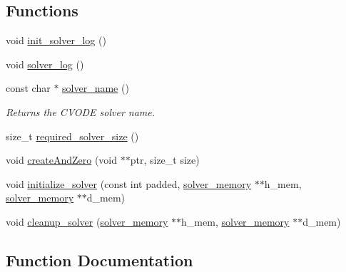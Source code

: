 \subsection*{Functions}
\begin{DoxyCompactItemize}
\item 
void \hyperlink{radau2a__init_8cu_a39c825543042903f579cd9c35a279dca}{init\+\_\+solver\+\_\+log} ()
\item 
void \hyperlink{radau2a__init_8cu_ae95cbe81062a829668c5fa8e28b2e2c7}{solver\+\_\+log} ()
\item 
const char $\ast$ \hyperlink{radau2a__init_8cu_a4ca568c33c1f8f478970cc5eec5d1d81}{solver\+\_\+name} ()
\begin{DoxyCompactList}\small\item\em Returns the C\+V\+O\+DE solver name. \end{DoxyCompactList}\item 
size\+\_\+t \hyperlink{radau2a__init_8cu_ab75ba2ae0b04dfd786322e7b34f49d84}{required\+\_\+solver\+\_\+size} ()
\item 
void \hyperlink{radau2a__init_8cu_aa4559ac37af59319f0c28865a2efdef0}{create\+And\+Zero} (void $\ast$$\ast$ptr, size\+\_\+t size)
\item 
void \hyperlink{radau2a__init_8cu_a30a747ce9a24af37c39f0ccbc093e13a}{initialize\+\_\+solver} (const int padded, \hyperlink{structsolver__memory}{solver\+\_\+memory} $\ast$$\ast$h\+\_\+mem, \hyperlink{structsolver__memory}{solver\+\_\+memory} $\ast$$\ast$d\+\_\+mem)
\item 
void \hyperlink{radau2a__init_8cu_a61dcb06647ae55dd950a9ea354b330d8}{cleanup\+\_\+solver} (\hyperlink{structsolver__memory}{solver\+\_\+memory} $\ast$$\ast$h\+\_\+mem, \hyperlink{structsolver__memory}{solver\+\_\+memory} $\ast$$\ast$d\+\_\+mem)
\end{DoxyCompactItemize}


\subsection{Function Documentation}
